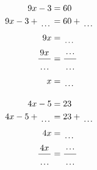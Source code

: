 \documentclass[12pt]{article}
\newcounter{minipagecount}
\begin{document}
\begin{multicols}{2}
\begin{minipage}[t]{0.45\textwidth}
    \raggedright %
    \begin{align*} %
        9x - 3 &= 60\\
        9x - 3 + \dotuline{\hspace{5mm}} &= 60 + \dotuline{\hspace{5mm}}\\
        9x &= \dotuline{\hspace{5mm}}\\
        \frac{9x}{\dotuline{\hspace{5mm}}} &= \frac{\dotuline{\hspace{5mm}}}{\dotuline{\hspace{5mm}}}\\
        x &= \dotuline{\hspace{5mm}}\\
    \end{align*}
\end{minipage} %
\noindent{(\theminipagecount)}\hspace{0.1mm} %
\begin{minipage}[t]{0.45\textwidth} %
    \vspace{-26pt}  %
    \raggedright %
    \begin{align*} %
        4x - 5 &= 23\\
        4x - 5 + \dotuline{\hspace{5mm}} &= 23 + \dotuline{\hspace{5mm}}\\
        4x &= \dotuline{\hspace{5mm}}\\
        \frac{4x}{\dotuline{\hspace{5mm}}} &= \frac{\dotuline{\hspace{5mm}}}{\dotuline{\hspace{5mm}}}\\

\end{align*}
\end{minipage}
\end{multicols}
\end{document}
